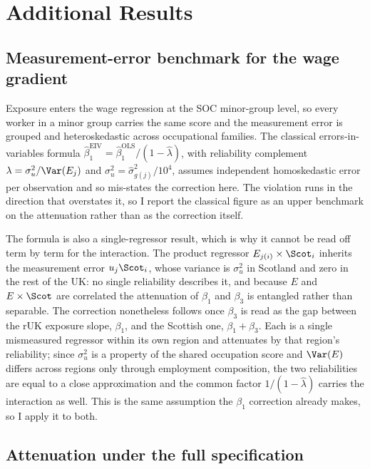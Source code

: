 \section{Additional Results}\label{app:additional}

\subsection*{Measurement-error benchmark for the wage gradient}

Exposure enters the wage regression at the SOC minor-group level, so every worker in a minor group carries the same score and the measurement error is grouped and heteroskedastic across occupational families. The classical errors-in-variables formula $\widehat{\beta}^{\mathrm{EIV}}_1 = \widehat{\beta}^{\mathrm{OLS}}_1 / (1 - \widehat{\lambda})$, with reliability complement $\lambda = \sigma^2_u / \Var(E_j)$ and $\sigma^2_u = \widehat{\sigma}^2_{g(j)} / 10^4$, assumes independent homoskedastic error per observation and so mis-states the correction here. The violation runs in the direction that overstates it, so I report the classical figure as an upper benchmark on the attenuation rather than as the correction itself.

The formula is also a single-regressor result, which is why it cannot be read off term by term for the interaction. The product regressor $E_{j(i)} \times \Scot_i$ inherits the measurement error $u_j \Scot_i$, whose variance is $\sigma^2_u$ in Scotland and zero in the rest of the UK: no single reliability describes it, and because $E$ and $E \times \Scot$ are correlated the attenuation of $\beta_1$ and $\beta_3$ is entangled rather than separable. The correction nonetheless follows once $\beta_3$ is read as the gap between the rUK exposure slope, $\beta_1$, and the Scottish one, $\beta_1 + \beta_3$. Each is a single mismeasured regressor within its own region and attenuates by that region's reliability; since $\sigma^2_u$ is a property of the shared occupation score and $\Var(E)$ differs across regions only through employment composition, the two reliabilities are equal to a close approximation and the common factor $1/(1 - \widehat{\lambda})$ carries the interaction as well. This is the same assumption the $\beta_1$ correction already makes, so I apply it to both.

\subsection*{Attenuation under the full specification}

